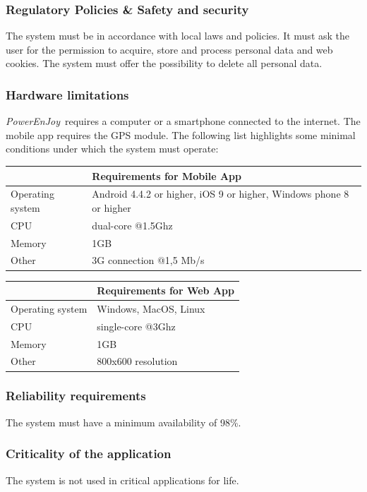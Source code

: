 \documentclass{article}
\newcommand{\pej}{\mbox{\normalfont\itshape PowerEnJoy }}
\begin{document}
		\subsubsection{Regulatory Policies \& Safety and security}
		The system must be in accordance with local laws and policies. It must ask the user for the permission to acquire, store and process personal data and web cookies. The system must offer the possibility to delete all personal data.
		\subsubsection{Hardware limitations}
		\pej requires a computer or a smartphone connected to the internet. The mobile app requires the GPS module. The following list highlights some minimal conditions under which the system must operate: 
		
			\begin{center}
				\begin{tabular}{ | l | p{5cm} |}
					\hline
					& Requirements for Mobile App\\ \hline
					Operating system & Android 4.4.2 or higher, iOS 9 or higher, Windows phone 8 or higher\\\hline
					CPU & dual-core @1.5Ghz\\\hline
					Memory & 1GB \\\hline
					Other & 3G connection @1,5 Mb/s \\\hline
				\end{tabular}
			\end{center}
			
			\begin{center}
				\begin{tabular}{ | l | p{5cm} |}
					\hline
					& Requirements for Web App\\ \hline
					Operating system & Windows, MacOS, Linux\\\hline
					CPU & single-core @3Ghz \\\hline
					Memory & 1GB \\\hline
					Other & 800x600 resolution \\\hline
				\end{tabular}
			\end{center}
		\subsubsection{Reliability requirements}
		The system must have a minimum availability of 98\%.
		\subsubsection{Criticality of the application} 
		The system is not used in critical applications for life.
\end{document}
